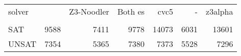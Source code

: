 \begin{tabular}{lrrrrrr}
\toprule
solver & \Ostrich{} & Z3-Noodler & Both \Ostrich{}es & cvc5 & \Ostrich{}-\Catra{} & z3alpha \\
 &  &  &  &  &  &  \\
\midrule
SAT & 9588 & 7411 & 9778 & 14073 & 6031 & 13601 \\
UNSAT & 7354 & 5365 & 7380 & 7373 & 5528 & 7296 \\
\bottomrule
\end{tabular}
